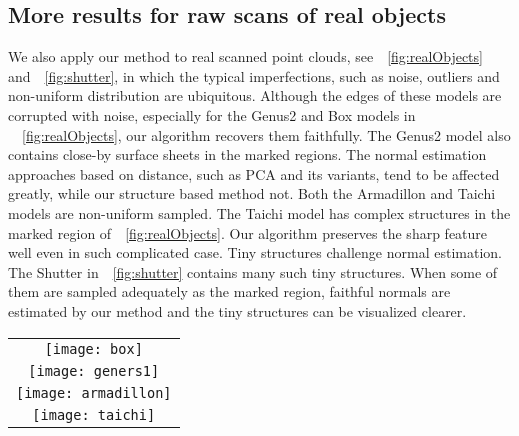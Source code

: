 \subsection{More results for raw scans of real objects}
\label{sec:moreResults}
We also apply our method to real scanned point clouds, see~\fig~\ref{fig:realObjects} and~\fig~\ref{fig:shutter}, in which the typical imperfections, such as noise, outliers and non-uniform distribution are ubiquitous.
Although the edges of these models are corrupted with noise, especially for the Genus2 and Box models in ~\fig~\ref{fig:realObjects}, our algorithm recovers them faithfully.
The Genus2 model also contains close-by surface sheets in the marked regions. The normal estimation approaches based on distance, such as PCA and its variants, tend to be affected greatly, while our structure based method not.
Both the Armadillon and Taichi models are non-uniform sampled. The Taichi model has complex structures in the marked region of~\fig~\ref{fig:realObjects}. Our algorithm preserves the sharp feature well even in such complicated case.
Tiny structures challenge normal estimation. The Shutter in~\fig~\ref{fig:shutter} contains many such tiny structures. When some of them are sampled adequately as the marked region, faithful normals are estimated by our method and the tiny structures can be visualized clearer.

\begin{figure*}
\begin{center}
    \begin{tabular}{c}
        \texttt{[image: box]}\\
        \texttt{[image: geners1]}\\
        \texttt{[image: armadillon]}\\
        \texttt{[image: taichi]}\\
    \end{tabular}
    \caption{Normal estimation for raw scans of real objects: Box (222.5k points), Genus2 (50k points), Armadillon (99.4k points) and Taichi (537.6k points). Left to right are the input model, the results of PCA and our algorithm, respectively.\label{fig:realObjects}}
\end{center}
\end{figure*}

